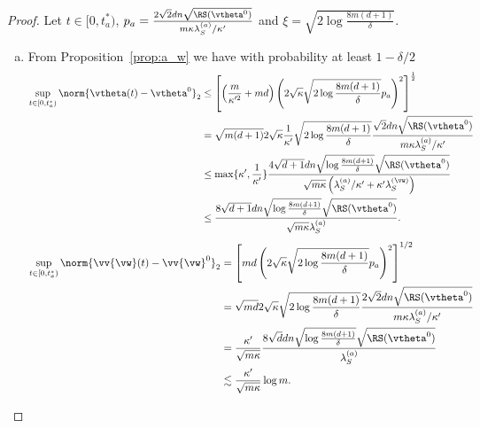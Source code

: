 \documentclass{article}
\begin{document}
\begin{proof}
    Let $t\in[0, t^*_a)$, $p_a=\frac{2\sqrt{2}dn\sqrt{\RS(\vtheta^0)}}{m\kappa\lambda_S^{(a)}/\kappa'}$ and $\xi=\sqrt{2\log\frac{8m(d+1)}{\delta}}$.
    \begin{enumerate}[(a)]
        \item From Proposition~\ref{prop:a_w} we have with probability at least $1-\delta/2$
              \begin{equation}
                  \begin{aligned}
                      \sup\limits_{t\in[0,t^*_a)}\norm{\vtheta(t)-\vtheta^0}_2
                       & \leq \left[\left(\frac{m}{\kappa'^2}+md\right)\left(2\sqrt{\kappa}\sqrt{2\log\frac{8m(d+1)}{\delta}}p_a\right)^2\right]^{\frac{1}{2}}                                                        \\
                       & =\sqrt{m(d+1)}2\sqrt{\kappa}\frac{1}{\kappa'}\sqrt{2\log\frac{8m(d+1)}{\delta}}\frac{\sqrt{2}dn\sqrt{\RS(\vtheta^0)}}{m\kappa\lambda_S^{(a)}/\kappa'}                                        \\
                       & \leq\max\{\kappa',\frac{1}{\kappa'}\}\frac{4\sqrt{d+1}dn\sqrt{\log\frac{8m(d+1)}{\delta}}\sqrt{\RS(\vtheta^0)}}{\sqrt{m\kappa}\left(\lambda_S^{(a)}/\kappa'+\kappa'\lambda_S^{(\vw)}\right)} \\
                       & \leq\frac{8\sqrt{d+1}dn\sqrt{\log\frac{8m(d+1)}{\delta}}\sqrt{\RS(\vtheta^0)}}{\sqrt{m\kappa}\lambda_S^{(a)}}.
                  \end{aligned}
              \end{equation}
              \begin{equation}
                  \begin{aligned}
                      \sup\limits_{t\in[0,t^*_a)}\norm{\vv{\vw}(t)-\vv{\vw}^0}_2
                       & = \left[md\left(2\sqrt{\kappa}\sqrt{2\log\frac{8m(d+1)}{\delta}}p_a\right)^2\right]^{1/2}                                          \\
                       & = \sqrt{md}2\sqrt{\kappa}\sqrt{2\log\frac{8m(d+1)}{\delta}}\frac{2\sqrt{2}dn\sqrt{\RS(\vtheta^0)}}{m\kappa\lambda_S^{(a)}/\kappa'} \\
                       & = \frac{\kappa'}{\sqrt{m\kappa}}\frac{8\sqrt{d}dn\sqrt{\log\frac{8m(d+1)}{\delta}}\sqrt{\RS(\vtheta^0)}}{\lambda_S^{(a)}}          \\
                       & \lesssim \frac{\kappa'}{\sqrt{m\kappa}}\log m.
                  \end{aligned}
              \end{equation}


\end{enumerate}
\end{proof}
\end{document}
